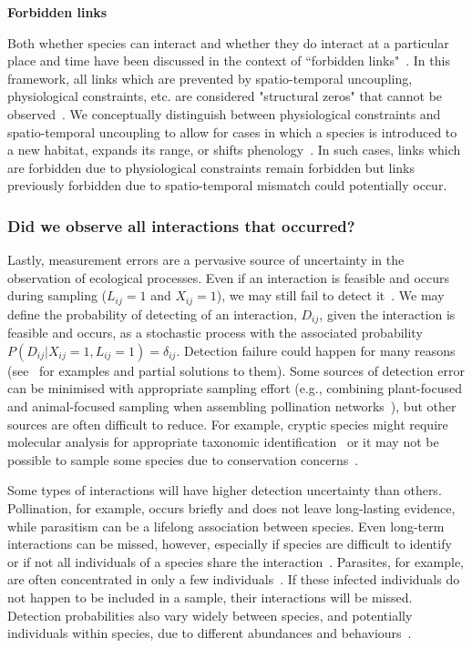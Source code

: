 \documentclass[12pt]{article}
\begin{document}
\begin{spacing}{2.0}
          \textbf{Forbidden links}

            Both whether species can interact and whether they do interact at a particular place and time have been discussed in the context of ``forbidden links"~\citep{Jordano2016}. In this framework, all links which are prevented by spatio-temporal uncoupling, physiological constraints, etc. are considered "structural zeros" that cannot be observed~\citep{Jordano1987,Jordano2016}. We conceptually distinguish between physiological constraints and spatio-temporal uncoupling to allow for cases in which a species is introduced to a new habitat, expands its range, or shifts phenology~\citep{Gravel2013}. In such cases, links which are forbidden due to physiological constraints remain forbidden but links previously forbidden due to spatio-temporal mismatch could potentially occur. 


        \subsubsection*{Did we observe all interactions that occurred?} 

          Lastly, measurement errors are a pervasive source of uncertainty in the observation of ecological processes. Even if an interaction is feasible and occurs during sampling ($L_{ij} = 1$ and $X_{ij} = 1$), we may still fail to detect it~\citep{Jordano2016,Weinstein2017}. We may define the probability of detecting of an interaction, $D_{ij}$, given the interaction is feasible and occurs, as a stochastic process with the associated probability $P(D_{ij}|X_{ij} = 1,L_{ij} = 1)=\delta_{ij}$. Detection failure could happen for many reasons (see~\citet{Wirta2014} for examples and partial solutions to them). Some sources of detection error can be minimised with appropriate sampling effort (e.g., combining plant-focused and animal-focused sampling when assembling pollination networks~\citet{Jordano2016}), but other sources are often difficult to reduce. For example, cryptic species might require molecular analysis for appropriate taxonomic identification~\citep{Wirta2014,Frost2016} or it may not be possible to sample some species due to conservation concerns~\citep{Lagrue2015}. 


          Some types of interactions will have higher detection uncertainty than others. Pollination, for example, occurs briefly and does not leave long-lasting evidence, while parasitism can be a lifelong association between species. Even long-term interactions can be missed, however, especially if species are difficult to identify or if not all individuals of a species share the interaction~\citep{Wells2013,Cirtwill2016}. Parasites, for example, are often concentrated in only a few individuals~\citep{Lagrue2015}. If these infected individuals do not happen to be included in a sample, their interactions will be missed. Detection probabilities also vary widely between species, and potentially individuals within species, due to different abundances and behaviours~\citep{Wells2013,Weinstein2017}.



\end{spacing}
\end{document}
